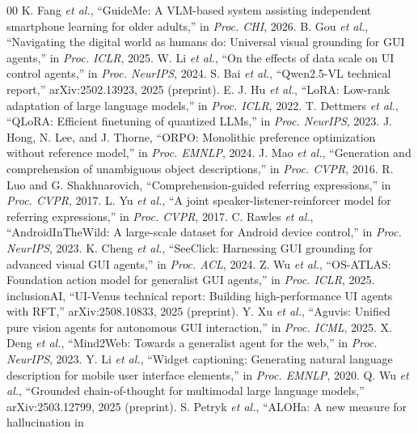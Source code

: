 \documentclass[conference]{IEEEtran}
\begin{document}
\setlength{\IEEEbibitemsep}{0pt plus .5pt}
\begin{thebibliography}{00}
 K. Fang \emph{et al.}, ``GuideMe: A VLM-based system assisting independent smartphone learning for older adults,'' in \emph{Proc. CHI}, 2026.
 B. Gou \emph{et al.}, ``Navigating the digital world as humans do: Universal visual grounding for GUI agents,'' in \emph{Proc. ICLR}, 2025.
 W. Li \emph{et al.}, ``On the effects of data scale on
UI control agents,'' in \emph{Proc. NeurIPS}, 2024.
 S. Bai \emph{et al.}, ``Qwen2.5-VL technical report,''
arXiv:2502.13923, 2025 (preprint).
 E. J. Hu \emph{et al.}, ``LoRA: Low-rank adaptation of large
language models,'' in \emph{Proc. ICLR}, 2022.
 T. Dettmers \emph{et al.},
``QLoRA: Efficient finetuning of quantized LLMs,'' in \emph{Proc. NeurIPS}, 2023.
 J. Hong, N. Lee, and J. Thorne, ``ORPO: Monolithic preference optimization
without reference model,'' in \emph{Proc. EMNLP}, 2024.
 J. Mao \emph{et al.}, ``Generation and comprehension of unambiguous object descriptions,'' in
\emph{Proc. CVPR}, 2016.
 R. Luo and G. Shakhnarovich, ``Comprehension-guided referring
expressions,'' in \emph{Proc. CVPR}, 2017.
 L. Yu \emph{et al.}, ``A joint
speaker-listener-reinforcer model for referring expressions,'' in \emph{Proc. CVPR},
2017.
 C. Rawles \emph{et al.},
``AndroidInTheWild: A large-scale dataset for Android device control,'' in
\emph{Proc. NeurIPS}, 2023.
 K. Cheng \emph{et al.}, ``SeeClick: Harnessing GUI grounding
for advanced visual GUI agents,'' in \emph{Proc. ACL}, 2024.
 Z. Wu \emph{et al.}, ``OS-ATLAS: Foundation action model for
generalist GUI agents,'' in \emph{Proc. ICLR}, 2025.
 inclusionAI, ``UI-Venus technical report: Building high-performance UI agents with RFT,'' arXiv:2508.10833, 2025 (preprint).
 Y. Xu \emph{et al.}, ``Aguvis: Unified pure vision agents for
autonomous GUI interaction,'' in \emph{Proc. ICML}, 2025.
 X. Deng \emph{et al.}, ``Mind2Web: Towards a generalist agent
for the web,'' in \emph{Proc. NeurIPS}, 2023.
 Y. Li \emph{et al.}, ``Widget captioning: Generating natural language description for mobile user interface elements,'' in \emph{Proc. EMNLP}, 2020.
 Q. Wu \emph{et al.},
``Grounded chain-of-thought for multimodal large language models,'' arXiv:2503.12799,
2025 (preprint).
 S. Petryk \emph{et al.}, ``ALOHa: A new measure for hallucination in

\end{thebibliography}
\end{document}
